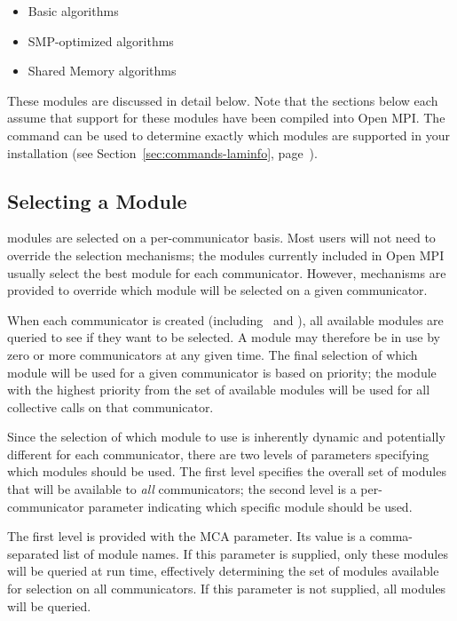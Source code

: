 \begin{itemize}
\item Basic algorithms
\item SMP-optimized algorithms
\item Shared Memory algorithms
\end{itemize}

These modules are discussed in detail below.  Note that the sections
below each assume that support for these modules have been compiled
into Open MPI.  The  command can be used to determine
exactly which modules are supported in your installation (see
Section~\ref{sec:commands-laminfo},
page~\pageref{sec:commands-laminfo}).


\subsection{Selecting a  Module}
\label{sec:mca-ompi-coll-select}

 modules are selected on a per-communicator basis.  Most
users will not need to override the  selection mechanisms;
the  modules currently included in Open MPI usually select
the best module for each communicator.  However, mechanisms are
provided to override which  module will be selected on a
given communicator.

When each communicator is created (including \mcw\ and \mcs), all
available  modules are queried to see if they want to be
selected.  A  module may therefore be in use by zero or
more communicators at any given time.  The final selection of which
module will be used for a given communicator is based on priority; the
module with the highest priority from the set of available modules
will be used for all collective calls on that communicator.

Since the selection of which module to use is inherently dynamic and
potentially different for each communicator, there are two levels of
parameters specifying which modules should be used.  The first level
specifies the overall set of  modules that will be
available to {\em all} communicators; the second level is a
per-communicator parameter indicating which specific module should be
used.

The first level is provided with the  MCA parameter.
Its value is a comma-separated list of  module names.  If
this parameter is supplied, only these modules will be queried at run
time, effectively determining the set of modules available for
selection on all communicators.  If this parameter is not supplied,
all  modules will be queried.

